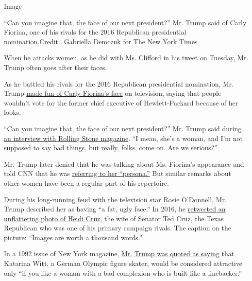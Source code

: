 Image

``Can you imagine that, the face of our next president?'' Mr. Trump said
of Carly Fiorina, one of his rivals for the 2016 Republican presidential
nomination.Credit...Gabriella Demczuk for The New York Times

When he attacks women, as he did with Ms. Clifford in his tweet on
Tuesday, Mr. Trump often goes after their faces.

As he battled his rivals for the 2016 Republican presidential
nomination, Mr. Trump
\href{https://www.nytimes3xbfgragh.onion/politics/first-draft/2015/09/10/donald-trumps-uncomplimentary-comments-about-carly-fiorina/}{made
fun of Carly Fiorina's face} on television, saying that people wouldn't
vote for the former chief executive of Hewlett-Packard because of her
looks.

``Can you imagine that, the face of our next president?'' Mr. Trump said
during
\href{https://www.rollingstone.com/politics/politics-news/trump-seriously-on-the-trail-with-the-gops-tough-guy-41447/}{an
interview with Rolling Stone magazine}. ``I mean, she's a woman, and I'm
not supposed to say bad things, but really, folks, come on. Are we
serious?''

Mr. Trump later denied that he was talking about Ms. Fiorina's
appearance and told CNN that he was
\href{https://www.nytimes3xbfgragh.onion/politics/first-draft/2015/09/10/donald-trump-denies-attacking-carly-fiorinas-looks/?ref=first-draft}{referring
to her ``persona.''} But similar remarks about other women have been a
regular part of his repertoire.

During his long-running feud with the television star Rosie O'Donnell,
Mr. Trump described her as having ``a fat, ugly face.'' In 2016, he
\href{https://twitter.com/realDonaldTrump/status/712850174838771712}{retweeted
an unflattering photo of Heidi Cruz}, the wife of Senator Ted Cruz, the
Texas Republican who was one of his primary campaign rivals. The caption
on the picture: ``Images are worth a thousand words.''

In a 1992 issue of New York magazine,
\href{https://books.google.co.uk/books?id=BeUCAAAAMBAJ\&pg=PA43\&lpg=PA43\&dq=if+you+like+a+woman+with+a+bad+complexion+who+is+built+like+a+linebacker\&source=bl\&ots=tX79s7pj6e\&sig=-MyardUohO0r2F5owgwjaWfoXnU\&hl=en\&sa=X\&ved=0ahUKEwi_4KDQgfvPAhVJBsAKHZ5gAagQ6AEIHjAB\#v=onepage\&q=if\%20you\%20like\%20a\%20woman\%20with\%20a\%20bad\%20complexion\%20who\%20is\%20built\%20like\%20a\%20linebacker\&f=false}{Mr.
Trump was quoted as saying} that Katarina Witt, a German Olympic figure
skater, would be considered attractive only ``if you like a woman with a
bad complexion who is built like a linebacker.''

